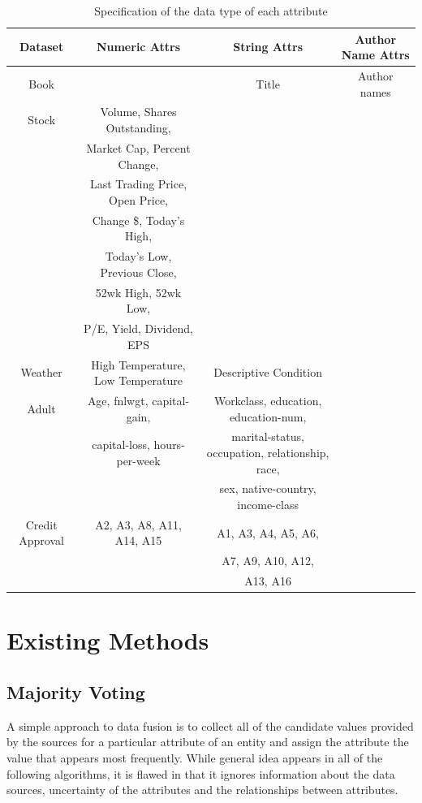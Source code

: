 \documentclass{acm_proc_article-sp}
\begin{document}
\begin{table}[t]
\small
\centering
\begin{tabular}{|c|c|c|c|}
\hline
\textbf{Dataset} & \bf Numeric Attrs & \bf  String Attrs & \bf Author Name Attrs\\
\hline
Book &  & Title &Author names \\
\hline
Stock & Volume, Shares Outstanding, & &\\
& Market Cap, Percent Change, & & \\
&  Last Trading Price, Open Price, && \\
& Change \$, Today's High, && \\
& Today's Low, Previous Close, && \\
& 52wk High, 52wk Low, && \\
& P/E, Yield, Dividend, EPS & & \\
\hline
Weather &  High Temperature, Low Temperature & Descriptive Condition & \\
\hline
Adult & Age, fnlwgt, capital-gain, & Workclass, education, education-num, & \\
& capital-loss, hours-per-week & marital-status, occupation, relationship, race, &\\
& & sex, native-country, income-class & \\
\hline
Credit Approval &  A2, A3, A8, A11, A14, A15 & A1, A3, A4, A5, A6,  & \\
& & A7, A9, A10, A12,  & \\
& & A13, A16  & \\
\hline
\end{tabular}
\caption{Specification of the data type of each attribute}
\label{fig:datatype} 
\end{table}


\section{Existing Methods}

\subsection{Majority Voting}

A simple approach to data fusion is to collect all of the candidate values provided by the sources for a particular attribute of an entity and assign the attribute the value that appears most frequently. While general idea appears in all of the following   algorithms,  it is flawed in that it ignores information about the data sources, uncertainty of the attributes and the relationships between  attributes.
\end{document}
